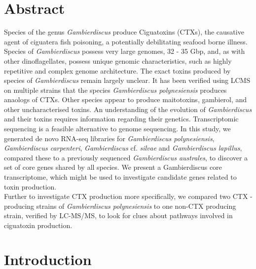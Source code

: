 \documentclass[12pt]{article}
\begin{document}
\section*{Abstract}
Species of the genus \textit{Gambierdiscus} produce Ciguatoxins (CTXs), the causative agent of ciguatera fish poisoning, a potentially debilitating seafood borne illness. 
Species of \textit{Gambierdiscus} possess very large genomes, 32 - 35 Gbp, and, as with other dinoflagellates, possess unique genomic characteristics, such as highly repetitive and complex genome architecture. 
The exact toxins produced by species of \textit{Gambierdiscus} remain largely unclear. 
It has been verified using LCMS on multiple strains that the species \textit{Gambierdiscus polynesiensis} produces anaologs of CTXs. 
Other species appear to produce maitotoxins, gambierol, and other uncharacterised toxins. 
An understanding of the evolution of \textit{Gambierdiscus} and their toxins requires information regarding their genetics. 
Transcriptomic sequencing is a feasible alternative to genome sequencing. 
In this study, we generated de novo RNA-seq libraries for \textit{Gambierdiscus polynesiensis}, \textit{Gambierdiscus carpenteri}, \textit{Gambierdiscus} cf. \textit{silvae} and \textit{Gambierdiscus lapillus}, compared these to a previously sequenced \textit{Gambierdiscus australes}, to discover a set of core genes shared by all species. 
We present a Gambierdiscus core transcriptome, which might be used to investigate candidate genes related to toxin production.\\
Further to investigate CTX production more specifically, we compared two CTX -producing strains of \textit{Gambierdiscus polynesiensis} to one non-CTX producing strain, verified by LC-MS/MS, to look for clues about pathways involved in ciguatoxin production.

\newpage
\section*{Introduction}
\end{document}
